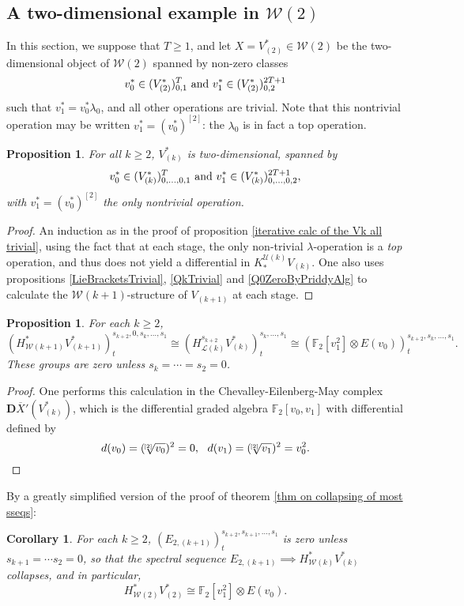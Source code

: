 \documentclass[11pt]{amsart}
\theoremstyle{plain}
\newtheorem{prop}[thm]{Proposition}
\newtheorem{cor}[thm]{Corollary}
\theoremstyle{definition}
\newcommand{\calW}{\mathcal{W}}
\newcommand{\calU}{\mathcal{U}}
\newcommand{\calL}{\mathcal{L}}
\theoremstyle{plain}
\newcommand{\restn}[1]{#1^{[2]}}
\newcommand{\dualrestn}[1]{\sqrt[{[2]}]{#1}}
\renewcommand{\dualrestn}[1]{\sqrt[{\!\!\![2]}]{#1}}
\newcommand{\UEAX}{\overline{X}'}%
\newcommand{\F}{\mathbb{F}}
\newcommand{\dual}{\mathbf{D}}
\begin{document}
\begin{Calculations of HWn for n nonzero}
\subsection{A two-dimensional example in $\calW(2)$}
In this section, we suppose that $T\geq1$, and let $X=V^*_{(2)}\in\calW(2)$ be the two-dimensional object of $\calW(2)$ spanned by non-zero classes 
\[v_{0}^{*}\in (V^*_{(2)})^{T}_{0,1}\textup{ and }v_{1}^{*}\in (V^*_{(2)})^{2T+1}_{0,2}\]
such that $v^*_{1}=v^*_0\lambda_{0}$, and all other operations are trivial. Note that this nontrivial operation may be written $v^*_{1}=\restn{(v^*_0)}$: the $\lambda_0$ is in fact a top operation.
\begin{prop}\label{2d example in w2}
For all $k\geq2$, $V^*_{(k)}$ is two-dimensional, spanned by
\[v_{0}^{*}\in (V^*_{(k)})^{T}_{0,\ldots,0,1}\textup{ and }v_{1}^{*}\in (V^*_{(k)})^{2T+1}_{0,\ldots,0,2},\]
with  $v^*_{1}=\restn{(v^*_0)}$ the only nontrivial operation.
\end{prop}
\begin{proof}
An induction as in the proof of proposition \ref{iterative calc of the Vk all trivial}, using the fact that at each stage, the only non-trivial $\lambda$-operation is a \emph{top} operation, and thus does not yield a differential in $K_*^{\calU(k)}V_{(k)}$. One also uses propositions \ref{LieBracketsTrivial}, \ref{QkTrivial} and \ref{Q0ZeroByPriddyAlg} to calculate the $\calW(k+1)$-structure of $V_{(k+1)}$ at each stage.
\end{proof}
\begin{prop}
For each $k\geq2$,
\[(H^*_{\calW(k+1)}V^*_{(k+1)})^{s_{k+2},0,s_k,\ldots,s_1}_{t}\cong (H^{s_{k+2}}_{\calL(k)}V^*_{(k)})^{s_k,\ldots,s_1}_t\cong (\F_2[v_1^{2}]\otimes E(v_0))_t^{s_{k+2},s_{k},\ldots,s_1}.\]
These groups are zero unless $s_k=\cdots =s_2=0$.
\end{prop}
\begin{proof}
One performs this calculation in the Chevalley-Eilenberg-May complex $\dual\UEAX(V^*_{(k)})$, which is the differential graded algebra $\F_2[v_0,v_1]$ with differential defined by
\[d(v_0)=(\dualrestn{v_0})^2=0,\ \ d(v_1)=(\dualrestn{v_1})^2=v_0^2.\qedhere\]
\end{proof}
By a greatly simplified version of the proof of theorem \ref{thm on collapsing of most sseqs}:
\begin{cor}\label{statement of result on 2d w2 example}
For each $k\geq2$, $(E_{2,(k+1)})^{s_{k+2},s_{k+1},\ldots,s_1}_{t}$ is zero unless $s_{k+1}=\cdots s_2=0$, so that the spectral sequence $E_{2,(k+1)}\implies H^*_{\calW(k)}V^*_{(k)}$ collapses, and in particular,
\[H^*_{\calW(2)}V^*_{(2)}\cong \F_2[v_1^{2}]\otimes E(v_0).\]
\end{cor}


\end{Calculations of HWn for n nonzero}
\end{document}
